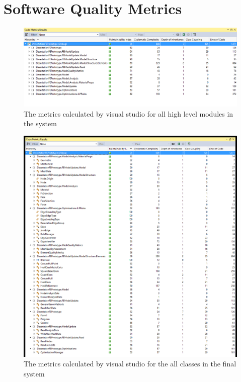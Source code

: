 \section{Software Quality Metrics}
\begin{figure}[h!!]
  \centerline{\includegraphics[width=165mm, scale=0.5]{../Graphics/softwareQualityMetrics.png}}
  \caption{The metrics calculated by visual studio for all high level modules in the system}
\end{figure}

\begin{figure}[h!!]
  \centerline{\includegraphics[width=165mm, scale=0.5]{../Graphics/qualityMetricsExpanded.png}}
  \caption{The metrics calculated by visual studio for the all classes in the final system}
\end{figure}
%


